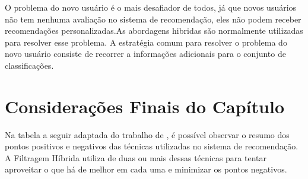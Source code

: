 O problema do novo usuário é o mais desafiador de todos, já que novos usuários não tem nenhuma 
avaliação no sistema de recomendação, eles não podem receber recomendações personalizadas\cite{burke2002}.As abordagens hibridas são normalmente utilizadas para resolver esse problema. 
A estratégia comum para resolver o problema do novo usuário consiste de recorrer a informações adicionais para o conjunto de classificações\cite{bobadilla2013}.

\section{Considerações Finais do Capítulo}

Na tabela a seguir adaptada do trabalho de , é possível observar o resumo dos pontos positivos e negativos das técnicas utilizadas no sistema de recomendação.
A Filtragem Híbrida utiliza de duas ou mais dessas técnicas para tentar aproveitar o que há de melhor em cada uma e minimizar os pontos negativos.

